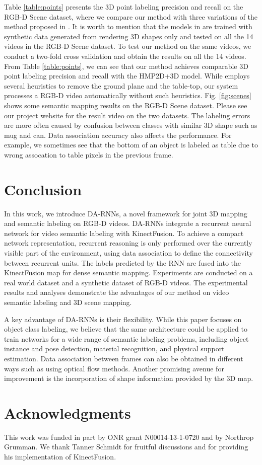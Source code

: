 \documentclass[conference]{IEEEtran}
\begin{document}
Table \ref{table:points} presents the 3D point labeling precision and recall on the RGB-D Scene dataset, where we compare our method with three variations of the method proposed in \cite{lai2014unsupervised}. It is worth to mention that the models in \cite{lai2014unsupervised} are trained with synthetic data generated from rendering 3D shapes only and tested on all the 14 videos in the RGB-D Scene dataset. To test our method on the same videos, we conduct a two-fold cross validation and obtain the results on all the 14 videos. From Table \ref{table:points}, we can see that our method achieves comparable 3D point labeling precision and recall with the HMP2D+3D model. While \cite{lai2014unsupervised} employs several heuristics to remove the ground plane and the table-top, our system processes a RGB-D video automatically without such heuristics. Fig. \ref{fig:scenes} shows some semantic mapping results on the RGB-D Scene dataset. Please see our project website for the result video on the two datasets. The labeling errors are more often caused by confusion between classes with similar 3D shape such as mug and can. Data association accuracy also affects the performance. For example, we sometimes see that the bottom of an object is labeled as table due to wrong assocation to table pixels in the previous frame.


\section{Conclusion} 

In this work, we introduce DA-RNNs, a novel framework for joint 3D mapping and semantic labeling on RGB-D videos. DA-RNNs integrate a recurrent neural network for video semantic labeling with KinectFusion. To achieve a compact network representation, recurrent reasoning is only performed over the currently visible part of the environment, using data association to define the connectivity between recurrent units. The labels predicted by the RNN are fused into the KinectFusion map for dense semantic mapping. Experiments are conducted on a real world dataset and a synthetic dataset of RGB-D videos. The experimental results and analyses demonstrate the advantages of our method on video semantic labeling and 3D scene mapping.

A key advantage of DA-RNNs is their flexibility. While this paper focuses on object class labeling, we believe that the same architecture could be applied to train networks for a wide range of semantic labeling problems, including object instance and pose detection, material recognition, and physical support estimation. Data association between frames can also be obtained in different ways such as using optical flow methods. Another promising avenue for improvement is the incorporation of shape information provided by the 3D map.

\vspace{-1mm}
\section*{Acknowledgments}

This work was funded in part by ONR grant N00014-13-1-0720 and by Northrop Grumman. We thank Tanner Schmidt for fruitful discussions and for providing his implementation of KinectFusion.



	
\end{document}
